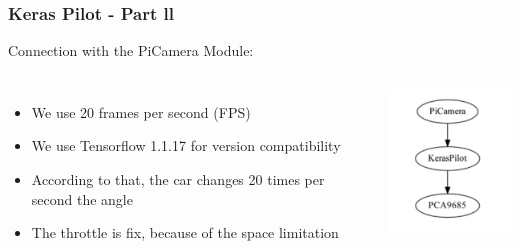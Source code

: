 \documentclass{beamer}
\begin{document}
\begin{frame}
\frametitle{Keras Pilot - Part ll}
Connection with the PiCamera Module:
\begin{columns}[c] %
\begin{itemize}
\item We use 20 frames per second (FPS)
\item We use Tensorflow 1.1.17 for version compatibility
\item According to that, the car changes 20 times per second the angle
\item The throttle is fix, because of the space limitation
\end{itemize}


\begin{center}
	\includegraphics[width=4cm]{photo/autonom}
\end{center}

\end{columns}
\end{frame}
\end{document}
